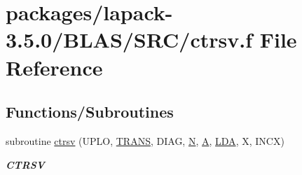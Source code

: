 \hypertarget{lapack-3_85_80_2BLAS_2SRC_2ctrsv_8f}{}\section{packages/lapack-\/3.5.0/\+B\+L\+A\+S/\+S\+R\+C/ctrsv.f File Reference}
\label{lapack-3_85_80_2BLAS_2SRC_2ctrsv_8f}
\subsection*{Functions/\+Subroutines}
\begin{DoxyCompactItemize}
\item 
subroutine \hyperlink{group__complex__blas__level2_ga38ae7f5a40e16fd315011faddf4412cc}{ctrsv} (U\+P\+L\+O, \hyperlink{superlu__enum__consts_8h_a0c4e17b2d5cea33f9991ccc6a6678d62a1f61e3015bfe0f0c2c3fda4c5a0cdf58}{T\+R\+A\+N\+S}, D\+I\+A\+G, \hyperlink{polmisc_8c_a0240ac851181b84ac374872dc5434ee4}{N}, \hyperlink{classA}{A}, \hyperlink{example__user_8c_ae946da542ce0db94dced19b2ecefd1aa}{L\+D\+A}, X, I\+N\+C\+X)
\begin{DoxyCompactList}\small\item\em {\bfseries C\+T\+R\+S\+V} \end{DoxyCompactList}\end{DoxyCompactItemize}
